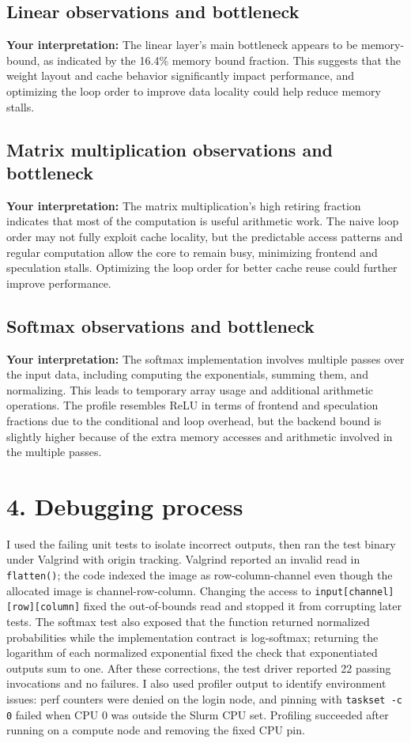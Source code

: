 \documentclass[10pt]{article}
\begin{document}
\subsection*{Linear observations and bottleneck}
\textbf{Your interpretation:} The linear layer's main bottleneck appears to be memory-bound, as indicated by the 16.4\% memory bound fraction. This suggests that the weight layout and cache behavior significantly impact performance, and optimizing the loop order to improve data locality could help reduce memory stalls.

\subsection*{Matrix multiplication observations and bottleneck}
\textbf{Your interpretation:} The matrix multiplication's high retiring fraction indicates that most of the computation is useful arithmetic work. The naive loop order may not fully exploit cache locality, but the predictable access patterns and regular computation allow the core to remain busy, minimizing frontend and speculation stalls. Optimizing the loop order for better cache reuse could further improve performance.

\subsection*{Softmax observations and bottleneck}
\textbf{Your interpretation:} The softmax implementation involves multiple passes over the input data, including computing the exponentials, summing them, and normalizing. This leads to temporary array usage and additional arithmetic operations. The profile resembles ReLU in terms of frontend and speculation fractions due to the conditional and loop overhead, but the backend bound is slightly higher because of the extra memory accesses and arithmetic involved in the multiple passes.

\section*{4. Debugging process}
I used the failing unit tests to isolate incorrect outputs, then ran the test binary under Valgrind with origin tracking. Valgrind reported an invalid read in \texttt{flatten()}; the code indexed the image as row-column-channel even though the allocated image is channel-row-column. Changing the access to \texttt{input[channel][row][column]} fixed the out-of-bounds read and stopped it from corrupting later tests. The softmax test also exposed that the function returned normalized probabilities while the implementation contract is log-softmax; returning the logarithm of each normalized exponential fixed the check that exponentiated outputs sum to one. After these corrections, the test driver reported 22 passing invocations and no failures. I also used profiler output to identify environment issues: perf counters were denied on the login node, and pinning with \texttt{taskset -c 0} failed when CPU 0 was outside the Slurm CPU set. Profiling succeeded after running on a compute node and removing the fixed CPU pin.
\end{document}

